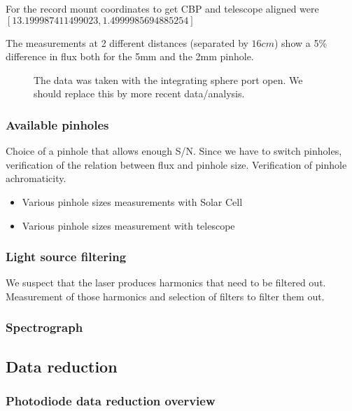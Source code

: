\documentclass[onecolumn]{aa}
\begin{document}
For the record mount coordinates to get CBP and telescope aligned were
$[13.199987411499023, 1.4999985694885254]$

The measurements at 2 different distances (separated by $16 cm$) show a 5\%
difference in flux both for the 5mm and the 2mm pinhole.

\begin{figure}[!ht]
\begin{center}
\end{center}
\caption[]{The data was taken with the integrating sphere port open. We should
  replace this by more recent data/analysis.}
\label{fig:distancevariation}
\end{figure}


\subsubsection{Available pinholes}

Choice of a pinhole that allows enough S/N. Since we have to switch pinholes,
verification of the relation between flux and pinhole size. Verification of
pinhole achromaticity.

\begin{itemize}
\item Various pinhole sizes measurements with Solar Cell
\item Various pinhole sizes measurement with telescope
\end{itemize}



\subsubsection{Light source filtering}

We suspect that the laser produces harmonics that need to be filtered
out. Measurement of those harmonics and selection of filters to filter them
out. 


\subsubsection{Spectrograph}


\subsection{Data reduction}



\subsubsection{Photodiode data reduction overview}
\end{document}
